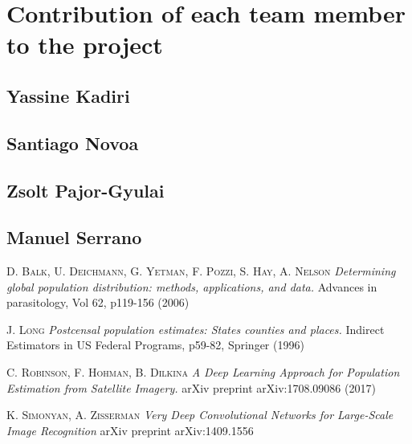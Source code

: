 \documentclass{article}
\begin{document}
\appendix
\section{Contribution of each team member to the project}
\subsection{Yassine Kadiri}
\subsection{Santiago Novoa}
\subsection{Zsolt Pajor-Gyulai}
\subsection{Manuel Serrano}

\begin{thebibliography}{9}

 \textsc{D. Balk, U. Deichmann, G. Yetman, F. Pozzi, S. Hay, A. Nelson} \textit{ Determining global population distribution: methods, applications, and data.} Advances in parasitology, Vol 62, p119-156 (2006)

 \textsc{J. Long}\textit{ Postcensal population estimates: States counties and places.} Indirect Estimators in US Federal Programs, p59-82, Springer (1996)

  \textsc{C. Robinson, F. Hohman, B. Dilkina}\textit{ A Deep Learning Approach for Population Estimation from Satellite Imagery.} arXiv preprint arXiv:1708.09086 (2017)

 \textsc{K. Simonyan, A. Zisserman} \textit{ Very Deep Convolutional Networks for Large-Scale Image Recognition} arXiv preprint arXiv:1409.1556
\end{thebibliography}
\end{document}
